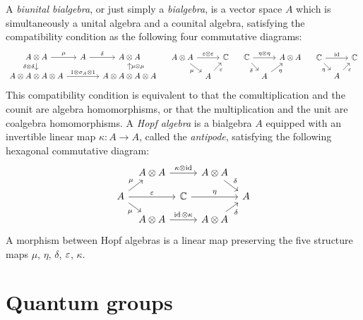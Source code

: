 \documentclass{../../large}
\begin{document}
\begin{prb}
A \emph{biunital bialgebra}, or just simply a \emph{bialgebra}, is a vector space $A$ which is simultaneously a unital algebra and a counital algebra, satisfying the compatibility condition as the following four commutative diagrams:
\[\begin{tikzcd}[sep=small]
A\otimes A \rar{\mu}\dar[swap]{\delta\otimes\delta} & A \rar{\delta} & A\otimes A\\
A\otimes A\otimes A\otimes A\ar{rr}{1\otimes\sigma_A\otimes1}&&A\otimes A\otimes A\otimes A\uar[swap]{\mu\otimes\mu}
\end{tikzcd}
\quad
\begin{tikzcd}[row sep=small,column sep=tiny]
A\otimes A \ar{rr}{\e\otimes\e}\ar[swap]{dr}{\mu} && \C\\
&A\ar[swap]{ur}{\e}&
\end{tikzcd}
\quad
\begin{tikzcd}[row sep=small,column sep=tiny]
\C \ar{rr}{\eta\otimes\eta}\ar[swap]{dr}{\delta} && A\otimes A\\
&A\ar[swap]{ur}{\eta}&
\end{tikzcd}
\quad
\begin{tikzcd}[row sep=small,column sep=tiny]
\C \ar{rr}{\id}\ar[swap]{dr}{\eta} &&\C\\
&A\ar[swap]{ur}{\e}&
\end{tikzcd}\]
This compatibility condition is equivalent to that the comultiplication and the counit are algebra homomorphisms, or that the multiplication and the unit are coalgebra homomorphisms.
A \emph{Hopf algebra} is a bialgebra $A$ equipped with an invertible linear map $\kappa:A\to A$, called the \emph{antipode}, satisfying the following hexagonal commutative diagram:
\[\begin{tikzcd}[row sep=small,column sep=tiny]
&A\otimes A\ar{rr}{\kappa\otimes\id}&&A\otimes A\ar{dr}{\delta}& \\
A\ar{rr}{\e}\ar{ur}{\mu}\ar[swap]{dr}{\mu}&&\C\ar{rr}{\eta}&&A \\
&A\otimes A\ar{rr}{\id\otimes\kappa}&&A\otimes A\ar[swap]{ur}{\delta}&
\end{tikzcd}\]
A morphism between Hopf algebras is a linear map preserving the five structure maps $\mu$, $\eta$, $\delta$, $\varepsilon$, $\kappa$.

\end{prb}
\chapter{Quantum groups}
\end{document}
